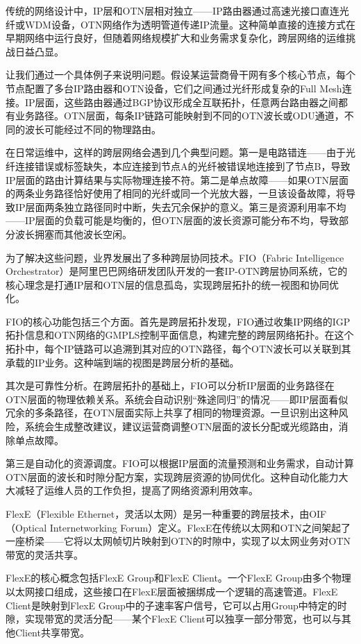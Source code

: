 传统的网络设计中，IP层和OTN层相对独立——IP路由器通过高速光接口直连光纤或WDM设备，OTN网络作为透明管道传递IP流量。这种简单直接的连接方式在早期网络中运行良好，但随着网络规模扩大和业务需求复杂化，跨层网络的运维挑战日益凸显。

让我们通过一个具体例子来说明问题。假设某运营商骨干网有多个核心节点，每个节点配置了多台IP路由器和OTN设备，它们之间通过光纤形成复杂的Full Mesh连接。IP层面，这些路由器通过BGP协议形成全互联拓扑，任意两台路由器之间都有业务路径。OTN层面，每条IP链路可能映射到不同的OTN波长或ODU通道，不同的波长可能经过不同的物理路由。

在日常运维中，这样的跨层网络会遇到几个典型问题。第一是电路错连——由于光纤连接错误或标签缺失，本应连接到节点A的光纤被错误地连接到了节点B，导致IP层面的路由计算结果与实际物理连接不符。第二是单点故障——如果OTN层面的两条业务路径恰好使用了相同的光纤或同一个光放大器，一旦该设备故障，将导致IP层面两条独立路径同时中断，失去冗余保护的意义。第三是资源利用率不均——IP层面的负载可能是均衡的，但OTN层面的波长资源可能分布不均，导致部分波长拥塞而其他波长空闲。

为了解决这些问题，业界发展出了多种跨层协同技术。FIO（Fabric Intelligence Orchestrator）是阿里巴巴网络研发团队开发的一套IP-OTN跨层协同系统，它的核心理念是打通IP层和OTN层的信息孤岛，实现跨层拓扑的统一视图和协同优化。

FIO的核心功能包括三个方面。首先是跨层拓扑发现，FIO通过收集IP网络的IGP拓扑信息和OTN网络的GMPLS控制平面信息，构建完整的跨层网络拓扑。在这个拓扑中，每个IP链路可以追溯到其对应的OTN路径，每个OTN波长可以关联到其承载的IP业务。这种端到端的视图是跨层分析的基础。

其次是可靠性分析。在跨层拓扑的基础上，FIO可以分析IP层面的业务路径在OTN层面的物理依赖关系。系统会自动识别“殊途同归”的情况——即IP层面看似冗余的多条路径，在OTN层面实际上共享了相同的物理资源。一旦识别出这种风险，系统会生成整改建议，建议运营商调整OTN层面的波长分配或光缆路由，消除单点故障。

第三是自动化的资源调度。FIO可以根据IP层面的流量预测和业务需求，自动计算OTN层面的波长和时隙分配方案，实现跨层资源的协同优化。这种自动化能力大大减轻了运维人员的工作负担，提高了网络资源利用效率。

FlexE（Flexible Ethernet，灵活以太网）是另一种重要的跨层技术，由OIF（Optical Internetworking Forum）定义。FlexE在传统以太网和OTN之间架起了一座桥梁——它将以太网帧切片映射到OTN的时隙中，实现了以太网业务对OTN带宽的灵活共享。

FlexE的核心概念包括FlexE Group和FlexE Client。一个FlexE Group由多个物理以太网接口组成，这些接口在FlexE层面被捆绑成一个逻辑的高速管道。FlexE Client是映射到FlexE Group中的子速率客户信号，它可以占用Group中特定的时隙，实现带宽的灵活分配——某个FlexE Client可以独享一部分带宽，也可以与其他Client共享带宽。

